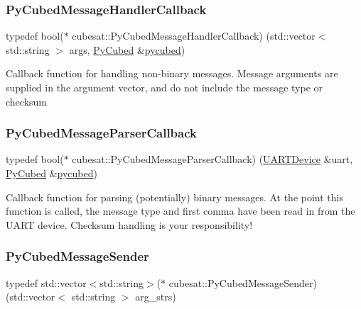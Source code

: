 \subsubsection{\texorpdfstring{Py\+Cubed\+Message\+Handler\+Callback}{PyCubedMessageHandlerCallback}}
{\footnotesize\ttfamily typedef bool($\ast$ cubesat\+::\+Py\+Cubed\+Message\+Handler\+Callback) (std\+::vector$<$ std\+::string $>$ args, \hyperlink{classcubesat_1_1PyCubed}{Py\+Cubed} \&\hyperlink{pycubed__test_8cpp_ae8c4c37e7742557f28bffebe72eeef5e}{pycubed})}

Callback function for handling non-\/binary messages. Message arguments are supplied in the argument vector, and do not include the message type or checksum \mbox{\label{namespacecubesat_ad7197c1bfb09998ced84827cb0dd1680}} 
\subsubsection{\texorpdfstring{Py\+Cubed\+Message\+Parser\+Callback}{PyCubedMessageParserCallback}}
{\footnotesize\ttfamily typedef bool($\ast$ cubesat\+::\+Py\+Cubed\+Message\+Parser\+Callback) (\hyperlink{classcubesat_1_1UARTDevice}{U\+A\+R\+T\+Device} \&uart, \hyperlink{classcubesat_1_1PyCubed}{Py\+Cubed} \&\hyperlink{pycubed__test_8cpp_ae8c4c37e7742557f28bffebe72eeef5e}{pycubed})}

Callback function for parsing (potentially) binary messages. At the point this function is called, the message type and first comma have been read in from the U\+A\+RT device. Checksum handling is your responsibility! \mbox{\label{namespacecubesat_a0cd8f3b1ff80acfd36cac73e8eb12b88}} 
\subsubsection{\texorpdfstring{Py\+Cubed\+Message\+Sender}{PyCubedMessageSender}}
{\footnotesize\ttfamily typedef std\+::vector$<$std\+::string$>$($\ast$ cubesat\+::\+Py\+Cubed\+Message\+Sender) (std\+::vector$<$ std\+::string $>$ arg\+\_\+strs)}

